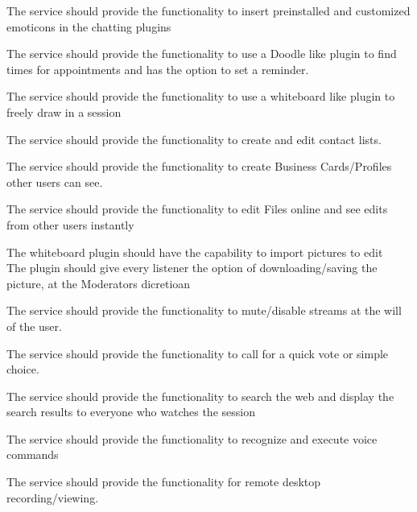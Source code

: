 \documentclass[8pt]{beamer}
\begin{document}
\begin{frame}
The service should provide the functionality to insert preinstalled
and customized emoticons in the chatting plugins
\end{frame}
\begin{frame}
The service should provide the functionality to use a Doodle like
plugin to find times for appointments and has the option to set a reminder.
\end{frame}
\begin{frame}
The service should provide the functionality to use a whiteboard like
plugin to freely draw in a session
\end{frame}
\begin{frame}
The service should provide the functionality to create and edit contact lists.
\end{frame}
\begin{frame}
The service should provide the functionality to create Business
Cards/Profiles other users can see.
\end{frame}
\begin{frame}
The service should provide the functionality to edit Files online and
see edits from other users instantly
\end{frame}
\begin{frame}
The whiteboard plugin should have the capability to import pictures to edit \\\pause The plugin should give every listener the option
of downloading/saving the picture, at the Moderators dicretioan
\end{frame}
\begin{frame}
 The service should provide the functionality to mute/disable streams
at the will of the user.
\end{frame}
\begin{frame}
The service should provide the functionality to call for a quick vote or simple choice.
\end{frame}
\begin{frame}
The service should provide the functionality to search the web and
display the search results to everyone who watches the session
\end{frame}
\begin{frame}
The service should provide the functionality to recognize and execute voice commands
\end{frame}
\begin{frame}
 The service should provide the functionality for remote desktop recording/viewing.
\end{frame}
\end{document}
